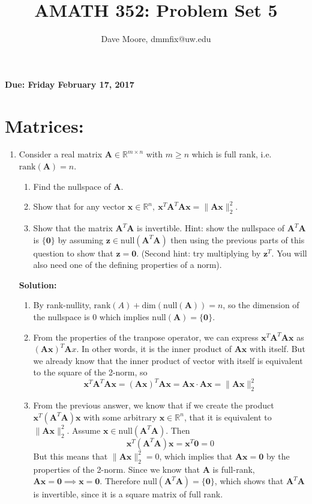 \documentclass[]{article}
\title{AMATH 352: Problem Set 5}
\author{Dave Moore, dmmfix@uw.edu}
\newcommand{\R}{\mathbb{R}}				%
\newcommand{\x}{\bm{x}}					%
\newcommand{\A}{\bm{A}}					%
\newcommand{\vdim}{\mathrm{dim}}		%
\newcommand{\vnull}{\mathrm{null}}		%
\newcommand{\vrank}{\mathrm{rank}}		%
\newcommand{\solution}{\vskip 0.5cm \textbf{\large Solution:} \\}
\begin{document}
\maketitle
    {\Large \textbf{Due: Friday February 17, 2017}} \\


    \section*{Matrices:}
    \begin{enumerate}
	\item Consider a real matrix $\A\in\R^{m\times n}$ with $m\geq n$ which is full rank, i.e. $\vrank(\A) = n$.
	  \begin{enumerate}
	  \item Find the nullspace of $\A$.
	  \item Show that for any vector $\x\in\R^n,~\x^T\A^T\A\x=\|\A\x\|^2_2$.
      \item Show that the matrix $\A^T\A$ is invertible. Hint: show the nullspace of $\A^T\A$ is $\{\bm{0}\}$ by assuming $\bm{z}\in\mathrm{null}(\A^T\A)$ then using the previous parts of this question to show that $\bm{z}=\bm{0}$. (Second hint: try multiplying by $\bm{z}^T$. You will also need one of the defining properties of a norm).
	  \end{enumerate}

	  \solution
	  \begin{enumerate}

      \item By rank-nullity, $\vrank(A) + \vdim(\vnull(\A)) = n$, so
        the dimension of the nullspace is 0 which implies $\vnull(\A)
        = \{\bm{0}\}$.

	  \item From the properties of the tranpose operator, we can
        express $\x^T\A^T\A\x$ as $(\A\x)^T\A x$. In other words, it
        is the inner product of $\A\x$ with itself. But we already
        know that the inner product of vector with itself is
        equivalent to the square of the 2-norm, so
        $$\x^T\A^T\A\x = (\A\x)^T\A \x = \A \x \cdot \A \x = \|\A\x\|^2_2$$

      \item From the previous answer, we know that if we create the
        product $\x^T(\A^T\A)\x$ with some arbitrary $\x \in \R^n$,
        that it is equivalent to $\|\A \x\|_2^2$. Assume $\x \in
        \vnull(\A^T\A)$. Then
        $$\x^T(\A^T\A)\x = \x^T\bm{0} = 0$$ But this means that $\|\A
        \x\|_2^2 = 0$, which implies that $\A \x = \bm{0}$ by the
        properties of the 2-norm. Since we know that $\A$ is
        full-rank, $\A \x = \bm{0} \implies \x = \bm{0}$. Therefore
        $\vnull(\A^T\A) = \{ \bm{0} \}$, which shows that $\A^T\A$ is
        invertible, since it is a square matrix of full rank.
        

\end{enumerate}
\end{enumerate}
\end{document}

